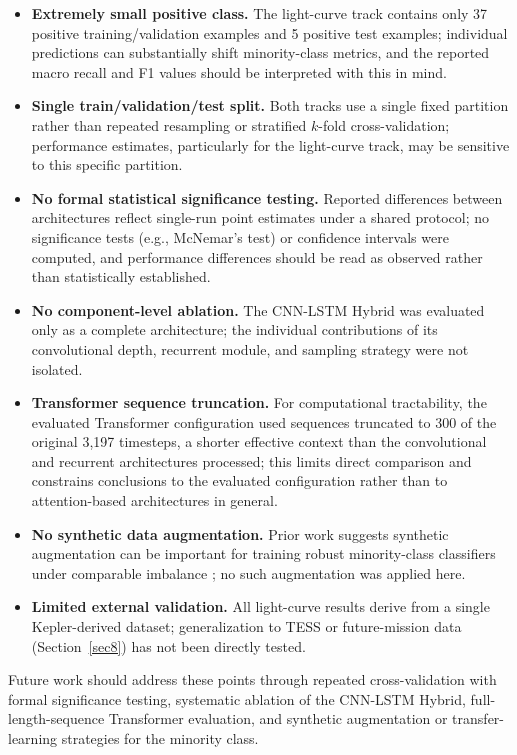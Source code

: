 \documentclass[preprint,11pt,times]{elsarticle}
\begin{document}
\begin{itemize}[leftmargin=1.6em]
\item \textbf{Extremely small positive class.} The light-curve track contains only 37 positive training/validation examples and 5 positive test examples; individual predictions can substantially shift minority-class metrics, and the reported macro recall and F1 values should be interpreted with this in mind.
\item \textbf{Single train/validation/test split.} Both tracks use a single fixed partition rather than repeated resampling or stratified $k$-fold cross-validation; performance estimates, particularly for the light-curve track, may be sensitive to this specific partition.
\item \textbf{No formal statistical significance testing.} Reported differences between architectures reflect single-run point estimates under a shared protocol; no significance tests (e.g., McNemar's test) or confidence intervals were computed, and performance differences should be read as observed rather than statistically established.
\item \textbf{No component-level ablation.} The CNN-LSTM Hybrid was evaluated only as a complete architecture; the individual contributions of its convolutional depth, recurrent module, and sampling strategy were not isolated.
\item \textbf{Transformer sequence truncation.} For computational tractability, the evaluated Transformer configuration used sequences truncated to 300 of the original 3,197 timesteps, a shorter effective context than the convolutional and recurrent architectures processed; this limits direct comparison and constrains conclusions to the evaluated configuration rather than to attention-based architectures in general.
\item \textbf{No synthetic data augmentation.} Prior work suggests synthetic augmentation can be important for training robust minority-class classifiers under comparable imbalance \cite{bib7}; no such augmentation was applied here.
\item \textbf{Limited external validation.} All light-curve results derive from a single Kepler-derived dataset; generalization to TESS or future-mission data (Section~\ref{sec8}) has not been directly tested.
\end{itemize}

Future work should address these points through repeated cross-validation with formal significance testing, systematic ablation of the CNN-LSTM Hybrid, full-length-sequence Transformer evaluation, and synthetic augmentation or transfer-learning strategies for the minority class.
\end{document}
